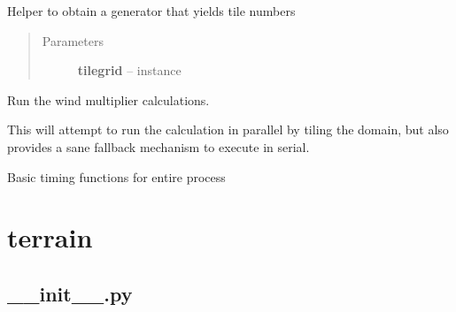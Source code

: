 \documentclass[letterpaper,10pt,english]{sphinxmanual}
\begin{document}

\begin{fulllineitems}
\label{docs/all_multipliers:all_multipliers.get_tiles}
Helper to obtain a generator that yields tile numbers
\begin{quote}\begin{description}
\item[{Parameters}] \leavevmode
\textbf{tilegrid} -- {\hyperref[docs/all_multipliers:all_multipliers.TileGrid]{}} instance

\end{description}\end{quote}

\end{fulllineitems}



\begin{fulllineitems}
\label{docs/all_multipliers:all_multipliers.run}
Run the wind multiplier calculations.

This will attempt to run the calculation in parallel by tiling the
domain, but also provides a sane fallback mechanism to execute
in serial.

\end{fulllineitems}



\begin{fulllineitems}
\label{docs/all_multipliers:all_multipliers.timer}
Basic timing functions for entire process

\end{fulllineitems}



\section{terrain}
\label{docs/terrain:terrain}\label{docs/terrain::doc}

\subsection{\_\_init\_\_.py}
\label{docs/terrain:init-py}\label{docs/terrain:module-__init__}
\end{document}
